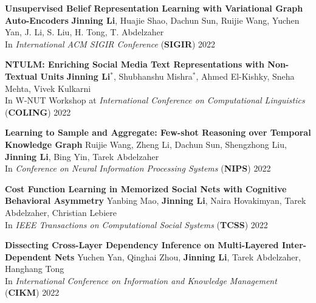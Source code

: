 \documentclass[12pt, letterpaper]{article}
\begin{document}
\textbf{Unsupervised Belief Representation Learning with Variational Graph Auto-Encoders}
\href{https://arxiv.org/abs/2110.00210}{}\href{https://github.com/jinningli/InfoVGAE}{}\newline
\footnotesize
\textbf{Jinning Li}, Huajie Shao, Dachun Sun, Ruijie Wang, Yuchen Yan, J. Li, S. Liu, H. Tong, T. Abdelzaher\\
In \emph{International ACM SIGIR Conference} (\textbf{SIGIR}) 2022
\small
\vspace{2pt}

\textbf{NTULM: Enriching Social Media Text Representations with Non-Textual Units}
\href{https://aclanthology.org/2022.wnut-1.7/}{}
\newline
\footnotesize
\textbf{Jinning Li}$^*$, Shubhanshu Mishra$^*$, Ahmed El-Kishky, Sneha Mehta, Vivek Kulkarni\\
In W-NUT Workshop at \emph{International Conference on
Computational Linguistics} (\textbf{COLING}) 2022
\small
\vspace{2pt}

\textbf{Learning to Sample and Aggregate: Few-shot Reasoning over Temporal Knowledge Graph}
\href{https://arxiv.org/abs/2210.08654}{}
\newline
\footnotesize
Ruijie Wang, Zheng Li, Dachun Sun, Shengzhong Liu, \textbf{Jinning Li}, Bing Yin, Tarek Abdelzaher\\
In \emph{Conference on Neural Information Processing Systems} (\textbf{NIPS}) 2022
\small
\vspace{2pt}

\textbf{Cost Function Learning in Memorized Social Nets with Cognitive Behavioral Asymmetry}
\href{https://ieeexplore.ieee.org/document/9945909}{}
\newline
\footnotesize
Yanbing Mao, \textbf{Jinning Li}, Naira Hovakimyan, Tarek Abdelzaher, Christian Lebiere\\
In \emph{IEEE Transactions on Computational Social Systems} (\textbf{TCSS}) 2022
\small
\vspace{2pt}

\textbf{Dissecting Cross-Layer Dependency Inference on Multi-Layered Inter-Dependent Nets}
\href{https://dl.acm.org/doi/abs/10.1145/3511808.3557291}{}
\newline
\footnotesize
Yuchen Yan, Qinghai Zhou, \textbf{Jinning Li}, Tarek Abdelzaher, Hanghang Tong\\
In \emph{International Conference on Information and Knowledge Management} (\textbf{CIKM}) 2022
\small
\vspace{2pt}
\end{document}
